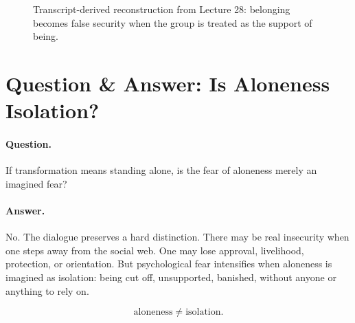 \documentclass[11pt,oneside]{book}
\begin{document}
\begin{figure}
\centering
{}
\caption{Transcript-derived reconstruction from Lecture 28: belonging becomes false security when the group is treated as the support of being.}
\end{figure}

\section{Question \& Answer: Is Aloneness Isolation?}

\paragraph{Question.}
If transformation means standing alone, is the fear of aloneness merely an imagined fear?

\paragraph{Answer.}
No. The dialogue preserves a hard distinction. There may be real insecurity when one steps away from the social web. One may lose approval, livelihood, protection, or orientation. But psychological fear intensifies when aloneness is imagined as isolation: being cut off, unsupported, banished, without anyone or anything to rely on.

\begin{equation}
\text{aloneness} \neq \text{isolation}.
\end{equation}
\end{document}
